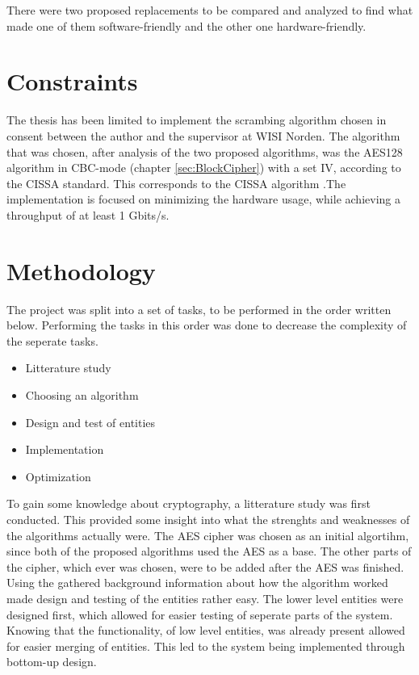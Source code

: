 There were two proposed replacements to be compared and analyzed 
to find what made one of them software-friendly and the other one 
hardware-friendly. 

\section{Constraints}
The thesis has been limited to implement the scrambing algorithm 
chosen in consent between the author and the supervisor at WISI 
Norden. The algorithm that was chosen, after analysis of the two 
proposed algorithms, was the AES128 algorithm in CBC-mode (chapter 
\ref{sec:BlockCipher}) with a set IV, according to the CISSA standard. 
This corresponds to the CISSA algorithm \citep{DVB:2013}.The 
implementation is focused on minimizing the hardware usage, while 
achieving a throughput of at least 1 Gbits/s.

\section{Methodology}
The project was split into a set of tasks, to be performed in the 
order written below. Performing the tasks in this order was done to 
decrease the complexity of the seperate tasks.

\begin{itemize}
\item Litterature study
\item Choosing an algorithm
\item Design and test of entities
\item Implementation
\item Optimization
\end{itemize}

To gain some knowledge about cryptography, a litterature study was 
first conducted. This provided some insight into what the strenghts 
and weaknesses of the algorithms actually were. The AES cipher was 
chosen as an initial algortihm, since both of the proposed algorithms 
used the AES as a base. The other parts of the cipher, which ever was 
chosen, were to be added after the AES was finished. Using the 
gathered background information about how the algorithm worked made 
design and testing of the entities rather easy. The lower level 
entities were designed first, which allowed for easier testing of 
seperate parts of the system. Knowing that the functionality, of low 
level entities, was already present allowed for easier merging of 
entities. This led to the system being implemented through bottom-up 
design.
